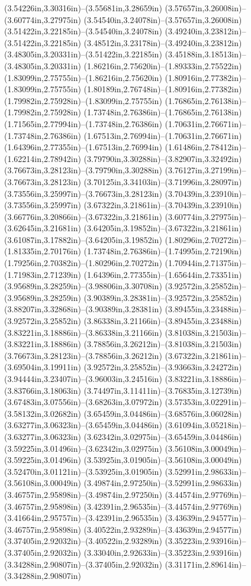 (3.54226in,3.30316in)--(3.55681in,3.28659in) (3.57657in,3.26008in)--(3.60774in,3.27975in) (3.54540in,3.24078in)--(3.57657in,3.26008in) (3.51422in,3.22185in)--(3.54540in,3.24078in) (3.49240in,3.23812in)--(3.51422in,3.22185in) (3.48512in,3.23178in)--(3.49240in,3.23812in) (3.48305in,3.20331in)--(3.51422in,3.22185in) (3.45188in,3.18513in)--(3.48305in,3.20331in) (1.86216in,2.75620in)--(1.89333in,2.75522in) (1.83099in,2.75755in)--(1.86216in,2.75620in) (1.80916in,2.77382in)--(1.83099in,2.75755in) (1.80189in,2.76748in)--(1.80916in,2.77382in) (1.79982in,2.75928in)--(1.83099in,2.75755in) (1.76865in,2.76138in)--(1.79982in,2.75928in) (1.73748in,2.76386in)--(1.76865in,2.76138in) (1.71565in,2.77994in)--(1.73748in,2.76386in) (1.70631in,2.76671in)--(1.73748in,2.76386in) (1.67513in,2.76994in)--(1.70631in,2.76671in) (1.64396in,2.77355in)--(1.67513in,2.76994in) (1.61486in,2.78412in)--(1.62214in,2.78942in) (3.79790in,3.30288in)--(3.82907in,3.32492in) (3.76673in,3.28123in)--(3.79790in,3.30288in) (3.76127in,3.27199in)--(3.76673in,3.28123in) (3.70125in,3.34103in)--(3.71996in,3.28097in) (3.73556in,3.25997in)--(3.76673in,3.28123in) (3.70439in,3.23910in)--(3.73556in,3.25997in) (3.67322in,3.21861in)--(3.70439in,3.23910in) (3.66776in,3.20866in)--(3.67322in,3.21861in) (3.60774in,3.27975in)--(3.62645in,3.21681in) (3.64205in,3.19852in)--(3.67322in,3.21861in) (3.61087in,3.17882in)--(3.64205in,3.19852in) (1.80296in,2.70272in)--(1.81335in,2.70176in) (1.73748in,2.76386in)--(1.74995in,2.72190in) (1.79256in,2.70382in)--(1.80296in,2.70272in) (1.70944in,2.71375in)--(1.71983in,2.71239in) (1.64396in,2.77355in)--(1.65644in,2.73351in) (3.95689in,3.28259in)--(3.98806in,3.30708in) (3.92572in,3.25852in)--(3.95689in,3.28259in) (3.90389in,3.28381in)--(3.92572in,3.25852in) (3.88207in,3.32868in)--(3.90389in,3.28381in) (3.89455in,3.23488in)--(3.92572in,3.25852in) (3.86338in,3.21166in)--(3.89455in,3.23488in) (3.83221in,3.18886in)--(3.86338in,3.21166in) (3.81038in,3.21503in)--(3.83221in,3.18886in) (3.78856in,3.26212in)--(3.81038in,3.21503in) (3.76673in,3.28123in)--(3.78856in,3.26212in) (3.67322in,3.21861in)--(3.69504in,3.19911in) (3.92572in,3.25852in)--(3.93663in,3.24272in) (3.94444in,3.23407in)--(3.96003in,3.24516in) (3.83221in,3.18886in)--(3.83766in,3.18063in) (3.74497in,3.11411in)--(3.76835in,3.12739in) (3.67483in,3.07556in)--(3.68263in,3.07972in) (3.57353in,3.02291in)--(3.58132in,3.02682in) (3.65459in,3.04486in)--(3.68576in,3.06028in) (3.63277in,3.06323in)--(3.65459in,3.04486in) (3.61094in,3.05218in)--(3.63277in,3.06323in) (3.62342in,3.02975in)--(3.65459in,3.04486in) (3.59225in,3.01496in)--(3.62342in,3.02975in) (3.56108in,3.00049in)--(3.59225in,3.01496in) (3.53925in,3.01905in)--(3.56108in,3.00049in) (3.52470in,3.01121in)--(3.53925in,3.01905in) (3.52991in,2.98633in)--(3.56108in,3.00049in) (3.49874in,2.97250in)--(3.52991in,2.98633in) (3.46757in,2.95898in)--(3.49874in,2.97250in) (3.44574in,2.97769in)--(3.46757in,2.95898in) (3.42391in,2.96535in)--(3.44574in,2.97769in) (3.41664in,2.95757in)--(3.42391in,2.96535in) (3.43639in,2.94577in)--(3.46757in,2.95898in) (3.40522in,2.93289in)--(3.43639in,2.94577in) (3.37405in,2.92032in)--(3.40522in,2.93289in) (3.35223in,2.93916in)--(3.37405in,2.92032in) (3.33040in,2.92633in)--(3.35223in,2.93916in) (3.34288in,2.90807in)--(3.37405in,2.92032in) (3.31171in,2.89614in)--(3.34288in,2.90807in) 
